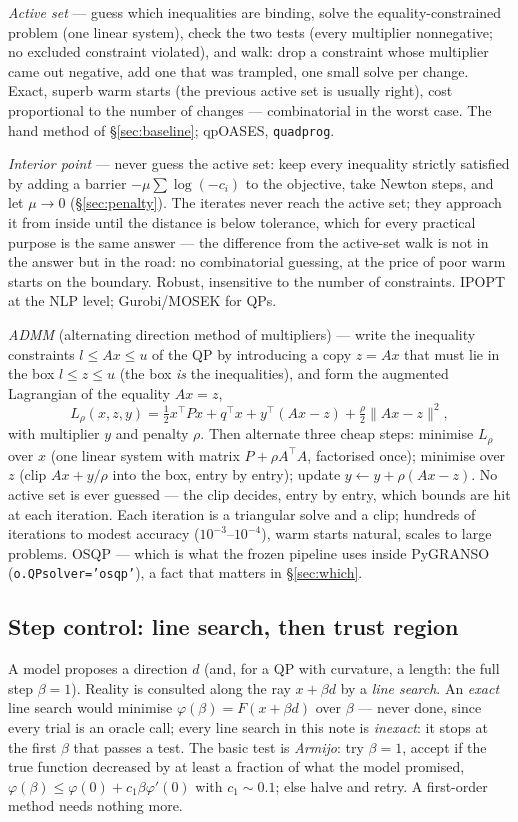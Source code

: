 \documentclass[11pt,a4paper]{article}
\newcommand{\code}[1]{\texttt{#1}}
\newcommand{\T}{^{\!\top}}
\newcommand{\rev}[1]{#1}
\newcommand{\revd}[1]{#1}
\begin{document}
\emph{Active set} --- guess which inequalities are binding, solve the equality-constrained
problem (one linear system), check the two tests (every multiplier nonnegative; no
excluded constraint violated), and walk: drop a constraint whose multiplier came out
negative, add one that was trampled, one small solve per change.  Exact, superb warm
starts (the previous active set is usually right), cost proportional to the number of
changes --- combinatorial in the worst case.  The hand method of \S\ref{sec:baseline};
qpOASES, \code{quadprog}.

\emph{Interior point} --- never guess the active set: keep every inequality strictly
satisfied by adding a barrier $-\mu\sum\log(-c_i)$ to the objective, take Newton steps,
and let $\mu\to0$ (\S\ref{sec:penalty}).  \rev{The iterates never reach the active set;
they approach it from inside until the distance is below tolerance, which for every
practical purpose is the same answer --- the difference from the active-set walk is not
in the answer but in the road: no combinatorial guessing, at the price of poor warm
starts on the boundary.}  Robust, insensitive to the number of constraints.  IPOPT at
the NLP level; Gurobi/MOSEK for QPs.

\emph{ADMM} (alternating direction method of multipliers) --- \rev{write the inequality
constraints $l\le Ax\le u$ of the QP by introducing a copy $z=Ax$ that must lie in the
box $l\le z\le u$ (the box \emph{is} the inequalities), and form the augmented
Lagrangian of the equality $Ax=z$,
\[
L_\rho(x,z,y)=\tfrac12x\T Px+q\T x+y\T(Ax-z)+\tfrac\rho2\|Ax-z\|^2 ,
\]
with multiplier $y$ and penalty $\rho$.  Then alternate three cheap steps: minimise
$L_\rho$ over $x$ (one linear system with matrix $P+\rho A\T A$, factorised once);
minimise over $z$ (clip $Ax+y/\rho$ into the box, entry by entry); update
$y\leftarrow y+\rho(Ax-z)$.  No active set is ever guessed --- the clip decides, entry by
entry, which bounds are hit at each iteration.}  Each iteration is a triangular solve and
a clip; hundreds of iterations to modest accuracy ($10^{-3}$--$10^{-4}$), warm starts
natural, scales to large problems.  OSQP --- which is what the frozen pipeline uses inside
PyGRANSO (\code{o.QPsolver='osqp'}), a fact that matters in \S\ref{sec:which}.

\subsection{Step control: line search, then trust region}
\label{sec:linesearch}
\revd{A model proposes a direction $d$ (and, for a QP with curvature, a length: the full
step $\beta=1$).  Reality is consulted along the ray $x+\beta d$ by a \emph{line search}.
An \emph{exact} line search would minimise $\varphi(\beta)=F(x+\beta d)$ over $\beta$ ---
never done, since every trial is an oracle call; every line search in this note is
\emph{inexact}: it stops at the first $\beta$ that passes a test.  The basic test is
\emph{Armijo}: try $\beta=1$, accept if the true function decreased by at least a
fraction of what the model promised, $\varphi(\beta)\le\varphi(0)+c_1\beta\varphi'(0)$
with $c_1\sim0.1$; else halve and retry.  A first-order method needs nothing more.}
\end{document}
